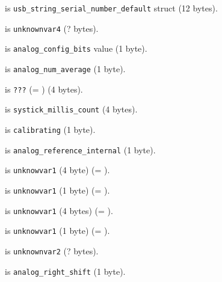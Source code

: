  is {\tiny
\texttt{usb\_string\_serial\_number\_default}} struct (12 bytes).

 is \texttt{unknownvar4} (? bytes).

 is \texttt{analog\_config\_bits} value (1 byte).

 is \texttt{analog\_num\_average} (1 byte).

 is \texttt{???} (= ) (4 bytes).

 is \texttt{systick\_millis\_count} (4 bytes).

 is \texttt{calibrating} (1 byte).

 is \texttt{analog\_reference\_internal} (1 byte).

 is \texttt{unknowvar1} (4 byte) (= ).

 is \texttt{unknowvar1} (1 byte) (= ).

 is \texttt{unknowvar1} (4 bytes) (= ).

 is \texttt{unknowvar1} (1 byte) (= ).

 is \texttt{unknownvar2} (? bytes).

 is \texttt{analog\_right\_shift} (1 byte).
